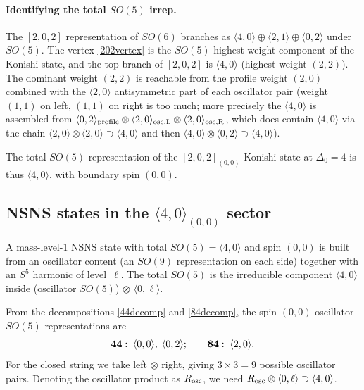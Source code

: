 \documentclass[12pt]{article}
\def\be{\begin{equation}}
\def\ee{\end{equation}}
\newcommand{\D}{\ensuremath{\Delta}}
\begin{document}
\paragraph{Identifying the total $SO(5)$ irrep.}
The $[2,0,2]$ representation of $SO(6)$ branches as $\langle 4,0\rangle\oplus\langle 2,1\rangle
\oplus\langle 0,2\rangle$ under $SO(5)$. The vertex \eqref{202vertex} is the
$SO(5)$ highest-weight component of the Konishi state, and the top branch of
$[2,0,2]$ is $\langle 4,0\rangle$ (highest weight $(2,2)$). The dominant weight $(2,2)$
is reachable from the profile weight $(2,0)$ combined with the $\langle 2,0\rangle$
antisymmetric part of each oscillator pair (weight $(1,1)$ on left, $(1,1)$ on right is
too much; more precisely the $\langle 4,0\rangle$ is assembled from
$\langle 0,2\rangle_{\rm profile}\otimes\langle 2,0\rangle_{\rm osc,L}
\otimes\langle 2,0\rangle_{\rm osc,R}$, which does contain $\langle 4,0\rangle$
via the chain $\langle 2,0\rangle\otimes\langle 2,0\rangle\supset\langle 4,0\rangle$
and then $\langle 4,0\rangle\otimes\langle 0,2\rangle\supset\langle 4,0\rangle$).

The total $SO(5)$ representation of the $[2,0,2]_{(0,0)}$ Konishi state
at $\D_0=4$ is thus $\langle 4,0\rangle$, with boundary spin $(0,0)$.

\subsection{NSNS states in the \texorpdfstring{$\langle 4,0\rangle_{(0,0)}$}{<4,0>(0,0)} sector}

A mass-level-1 NSNS state with total $SO(5)=\langle 4,0\rangle$ and spin $(0,0)$
is built from an oscillator content (an $SO(9)$ representation on each side) together with
an $S^5$ harmonic of level~$\ell$. The total $SO(5)$ is the irreducible component
$\langle 4,0\rangle$ inside (oscillator $SO(5)$)$\,\otimes\,\langle 0,\ell\rangle$.

From the decompositions \eqref{44decomp} and \eqref{84decomp}, the spin-$(0,0)$
oscillator $SO(5)$ representations are
\be
{\bf 44}:\;\langle 0,0\rangle,\;\langle 0,2\rangle;
\qquad
{\bf 84}:\;\langle 2,0\rangle.
\ee
For the closed string we take left$\,\otimes\,$right, giving $3\times 3=9$ possible
oscillator pairs. Denoting the oscillator product as $R_{\rm osc}$, we need
$R_{\rm osc}\otimes\langle 0,\ell\rangle\supset\langle 4,0\rangle$.
\end{document}

